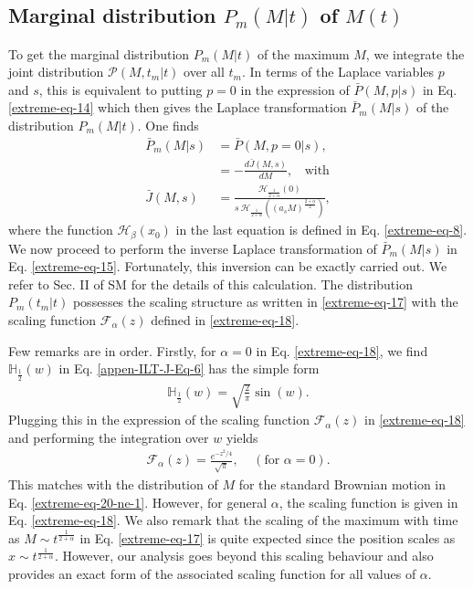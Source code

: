 \documentclass[showpacs,amsmath,amssymb,aps,pre,twocolumn,]{revtex4-1}
\def\greenw#1{{\color{black} #1}}
\begin{document}
\subsection{Marginal distribution $P_m(M|t)$ of $M(t)$}
\label{MargM}
To get the marginal distribution  $P_m(M|t)$ of the maximum $M$, we integrate the joint distribution $ \mathcal{P}(M,t_m|t)$ over all $t_m$. In terms of the Laplace variables $p$ and $s$, this is equivalent to putting $p=0$ in the expression of $\bar{P}(M, p|s)$ in Eq. \eqref{extreme-eq-14} which then gives the Laplace transformation $\bar{P}_m(M|s)$ of the distribution $P_m(M|t)$. One finds
\begin{align}
\bar{P}_m(M|s)& = \bar{P}(M, p=0|s), \nonumber \\
& =-\frac{d \bar{J}(M,s)}{dM},~~~~\text{with} \label{extreme-eq-15} \\
\bar{J}(M,s)&= \frac{\mathcal{H}_{\frac{1}{2+\alpha}} \left(0 \right)}{s ~\mathcal{H}_{\frac{1}{2+\alpha}} \left( (a_s M)^{\frac{2+\alpha}{2}} \right)}, \label{extreme-eq-16} 
\end{align}
where the function $\mathcal{H}_{\beta}(x_0)$ in the last equation is defined in Eq. \eqref{extreme-eq-8}. We now proceed to perform the inverse Laplace transformation of $\bar{P}_m(M|s)$ in Eq. \eqref{extreme-eq-15}. Fortunately, this inversion can be exactly carried out. We refer to Sec. II of SM \cite{Supplementary} for the details of this calculation. The distribution $P_m(t_m|t)$ possesses the scaling structure as written in \eqref{extreme-eq-17} with the scaling function $\mathcal{F}_{\alpha}(z)$ defined in \eqref{extreme-eq-18}. 


Few remarks are in order. Firstly, for $\alpha =0$ in Eq. \eqref{extreme-eq-18}, we find $\mathbb{H}_{\frac{1}{2}}(w) $ in Eq. \eqref{appen-ILT-J-Eq-6} has the simple form 
\begin{align}
\mathbb{H}_{\frac{1}{2}}(w) = \sqrt{\frac{2}{\pi}} \sin (w).
\end{align}
Plugging this in the expression of the scaling function $\mathcal{F}_{\alpha}(z)$ in \eqref{extreme-eq-18} and performing the integration over $w$ yields
\begin{align}
\mathcal{F}_{\alpha}(z) = \frac{e^{-z^2/4}}{\sqrt{\pi}} ,~~~~~(\text{for }\alpha =0).
\label{extreme-eq-20}
\end{align}
This matches with the distribution of $M$ for the standard Brownian motion in Eq. \eqref{extreme-eq-20-ne-1}. However, for general $\alpha$, the scaling function is given in Eq. \eqref{extreme-eq-18}. \greenw{We also remark that the scaling of the maximum with time as $M \sim t^{\frac{1}{2+\alpha}}$ in Eq. \eqref{extreme-eq-17} is quite expected since the position scales as $x \sim t^{\frac{1}{2+\alpha}}$. However, our analysis goes beyond this scaling behaviour and also provides an exact form of the associated scaling function for all values of $\alpha$.}
\end{document}
